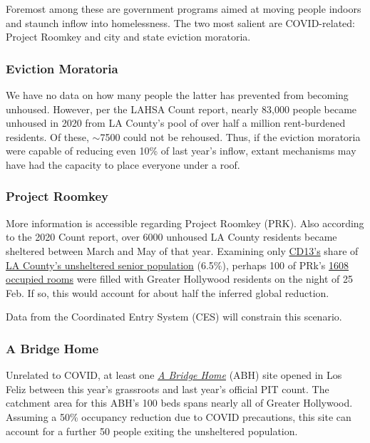\documentclass[11pt,twocolumn]{article}
\begin{document}
Foremost among these are government programs aimed at moving people indoors and staunch inflow into 
homelessness. The two most salient are COVID-related: Project Roomkey and city and state eviction moratoria.

\subsubsection{Eviction Moratoria}

We have no data on how many people the latter has prevented from becoming unhoused. However,
per the LAHSA Count report, nearly 83,000 people became unhoused in 2020 from LA County's pool 
of over half a million rent-burdened residents. Of these, $\sim$7500 could not be rehoused. Thus, if the eviction
moratoria were capable of reducing even 10\% of last year's inflow, extant mechanisms may have had the 
capacity to place everyone under a roof.

\subsubsection{Project Roomkey}

More information is accessible regarding Project Roomkey (PRK). Also according to the 2020 Count report, 
over 6000 unhoused LA County residents became sheltered between March and May of that year.
Examining only \href{https://www.lahsa.org/documents?id=4672-2020-homeless-count-council-district-13}
{CD13's} share of \href{https://www.lahsa.org/documents?id=4585-2020-greater-los-angeles-homeless-count-los-angeles-continuum-of-care-coc-}{LA County's unsheltered senior population} (6.5\%), perhaps 100 of PRk's 
\href{https://projectroomkeytracker.com/}{1608 occupied rooms} were filled with Greater Hollywood residents 
on the night of 25 Feb. If so, this would account for about half the inferred global reduction.

Data from the Coordinated Entry System (CES) will constrain this scenario.

\subsubsection{A Bridge Home}

Unrelated to COVID, at least one \href{https://www.lamayor.org/ABridgeHome}{\it A Bridge Home} (ABH) site 
opened in Los Feliz between this year's grassroots and last year's official PIT count. The catchment area for this ABH's
100 beds spans nearly all of Greater Hollywood. Assuming a 50\% occupancy reduction due to COVID precautions,
this site can account for a further 50 people exiting the unsheltered population.
\end{document}
